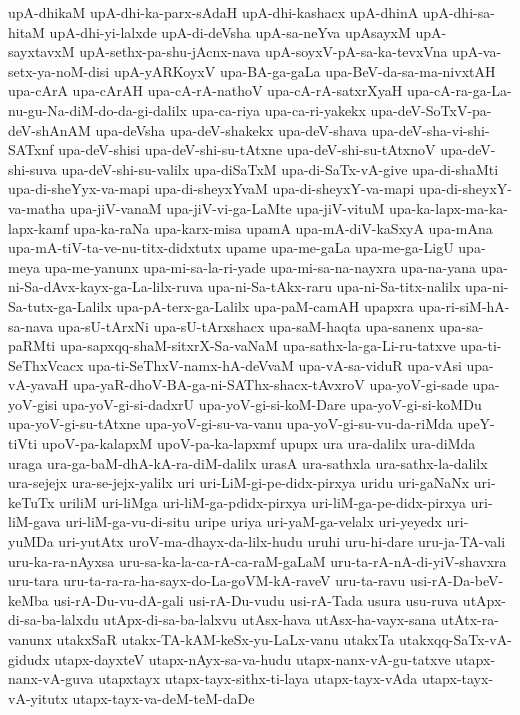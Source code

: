 {upA-dhikaM
upA-dhi-ka-parx-sAdaH
upA-dhi-kashacx
upA-dhinA
upA-dhi-sa-hitaM
upA-dhi-yi-lalxde
upA-di-deVsha
upA-sa-neYva
upAsayxM
upA-sayxtavxM
upA-sethx-pa-shu-jAcnx-nava
upA-soyxV-pA-sa-ka-tevxVna
upA-va-setx-ya-noM-disi
upA-yARKoyxV
upa-BA-ga-gaLa
upa-BeV-da-sa-ma-nivxtAH
upa-cArA
upa-cArAH
upa-cA-rA-nathoV
upa-cA-rA-satxrXyaH
upa-cA-ra-ga-La-nu-gu-Na-diM-do-da-gi-dalilx
upa-ca-riya
upa-ca-ri-yakekx
upa-deV-SoTxV-pa-deV-shAnAM
upa-deVsha
upa-deV-shakekx
upa-deV-shava
upa-deV-sha-vi-shi-SATxnf
upa-deV-shisi
upa-deV-shi-su-tAtxne
upa-deV-shi-su-tAtxnoV
upa-deV-shi-suva
upa-deV-shi-su-valilx
upa-diSaTxM
upa-di-SaTx-vA-give
upa-di-shaMti
upa-di-sheYyx-va-mapi
upa-di-sheyxYvaM
upa-di-sheyxY-va-mapi
upa-di-sheyxY-va-matha
upa-jiV-vanaM
upa-jiV-vi-ga-LaMte
upa-jiV-vituM
upa-ka-lapx-ma-ka-lapx-kamf
upa-ka-raNa
upa-karx-misa
upamA
upa-mA-diV-kaSxyA
upa-mAna
upa-mA-tiV-ta-ve-nu-titx-didxtutx
upame
upa-me-gaLa
upa-me-ga-LigU
upa-meya
upa-me-yanunx
upa-mi-sa-la-ri-yade
upa-mi-sa-na-nayxra
upa-na-yana
upa-ni-Sa-dAvx-kayx-ga-La-lilx-ruva
upa-ni-Sa-tAkx-raru
upa-ni-Sa-titx-nalilx
upa-ni-Sa-tutx-ga-Lalilx
upa-pA-terx-ga-Lalilx
upa-paM-camAH
upapxra
upa-ri-siM-hA-sa-nava
upa-sU-tArxNi
upa-sU-tArxshacx
upa-saM-haqta
upa-sanenx
upa-sa-paRMti
upa-sapxqq-shaM-sitxrX-Sa-vaNaM
upa-sathx-la-ga-Li-ru-tatxve
upa-ti-SeThxVcacx
upa-ti-SeThxV-namx-hA-deVvaM
upa-vA-sa-viduR
upa-vAsi
upa-vA-yavaH
upa-yaR-dhoV-BA-ga-ni-SAThx-shacx-tAvxroV
upa-yoV-gi-sade
upa-yoV-gisi
upa-yoV-gi-si-dadxrU
upa-yoV-gi-si-koM-Dare
upa-yoV-gi-si-koMDu
upa-yoV-gi-su-tAtxne
upa-yoV-gi-su-va-vanu
upa-yoV-gi-su-vu-da-riMda
upeY-tiVti
upoV-pa-kalapxM
upoV-pa-ka-lapxmf
upupx
ura
ura-dalilx
ura-diMda
uraga
ura-ga-baM-dhA-kA-ra-diM-dalilx
urasA
ura-sathxla
ura-sathx-la-dalilx
ura-sejejx
ura-se-jejx-yalilx
uri
uri-LiM-gi-pe-didx-pirxya
uridu
uri-gaNaNx
uri-keTuTx
uriliM
uri-liMga
uri-liM-ga-pdidx-pirxya
uri-liM-ga-pe-didx-pirxya
uri-liM-gava
uri-liM-ga-vu-di-situ
uripe
uriya
uri-yaM-ga-velalx
uri-yeyedx
uri-yuMDa
uri-yutAtx
uroV-ma-dhayx-da-lilx-hudu
uruhi
uru-hi-dare
uru-ja-TA-vali
uru-ka-ra-nAyxsa
uru-sa-ka-la-ca-rA-ca-raM-gaLaM
uru-ta-rA-nA-di-yiV-shavxra
uru-tara
uru-ta-ra-ra-ha-sayx-do-La-goVM-kA-raveV
uru-ta-ravu
usi-rA-Da-beV-keMba
usi-rA-Du-vu-dA-gali
usi-rA-Du-vudu
usi-rA-Tada
usura
usu-ruva
utApx-di-sa-ba-lalxdu
utApx-di-sa-ba-lalxvu
utAsx-hava
utAsx-ha-vayx-sana
utAtx-ra-vanunx
utakxSaR
utakx-TA-kAM-keSx-yu-LaLx-vanu
utakxTa
utakxqq-SaTx-vA-gidudx
utapx-dayxteV
utapx-nAyx-sa-va-hudu
utapx-nanx-vA-gu-tatxve
utapx-nanx-vA-guva
utapxtayx
utapx-tayx-sithx-ti-laya
utapx-tayx-vAda
utapx-tayx-vA-yitutx
utapx-tayx-va-deM-teM-daDe
}

